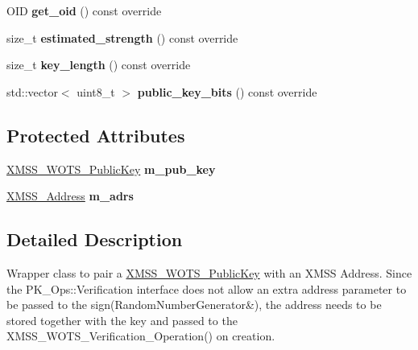 \begin{DoxyCompactItemize}
\item 
\mbox{\label{class_botan_1_1_x_m_s_s___w_o_t_s___addressed___public_key_a73864a18db68d0029270ac627329e2c3}} 
O\+ID {\bfseries get\+\_\+oid} () const override
\item 
\mbox{\label{class_botan_1_1_x_m_s_s___w_o_t_s___addressed___public_key_aef61571c7f3a9f258a1fc1161d5e5e8c}} 
size\+\_\+t {\bfseries estimated\+\_\+strength} () const override
\item 
\mbox{\label{class_botan_1_1_x_m_s_s___w_o_t_s___addressed___public_key_ac10064e001881c3066fb9c4230d48de2}} 
size\+\_\+t {\bfseries key\+\_\+length} () const override
\item 
\mbox{\label{class_botan_1_1_x_m_s_s___w_o_t_s___addressed___public_key_a1a9c465313309082bfe382003dfa2e9e}} 
std\+::vector$<$ uint8\+\_\+t $>$ {\bfseries public\+\_\+key\+\_\+bits} () const override
\end{DoxyCompactItemize}
\subsection*{Protected Attributes}
\begin{DoxyCompactItemize}
\item 
\mbox{\label{class_botan_1_1_x_m_s_s___w_o_t_s___addressed___public_key_a17123300b18d6aeace6f16923f019e7a}} 
\mbox{\hyperlink{class_botan_1_1_x_m_s_s___w_o_t_s___public_key}{X\+M\+S\+S\+\_\+\+W\+O\+T\+S\+\_\+\+Public\+Key}} {\bfseries m\+\_\+pub\+\_\+key}
\item 
\mbox{\label{class_botan_1_1_x_m_s_s___w_o_t_s___addressed___public_key_a9a0de534a2d6346ac2ddb27c069cb380}} 
\mbox{\hyperlink{class_botan_1_1_x_m_s_s___address}{X\+M\+S\+S\+\_\+\+Address}} {\bfseries m\+\_\+adrs}
\end{DoxyCompactItemize}


\subsection{Detailed Description}
Wrapper class to pair a \mbox{\hyperlink{class_botan_1_1_x_m_s_s___w_o_t_s___public_key}{X\+M\+S\+S\+\_\+\+W\+O\+T\+S\+\_\+\+Public\+Key}} with an X\+M\+SS Address. Since the P\+K\+\_\+\+Ops\+::\+Verification interface does not allow an extra address parameter to be passed to the sign(\+Random\+Number\+Generator\&), the address needs to be stored together with the key and passed to the X\+M\+S\+S\+\_\+\+W\+O\+T\+S\+\_\+\+Verification\+\_\+\+Operation() on creation. 

